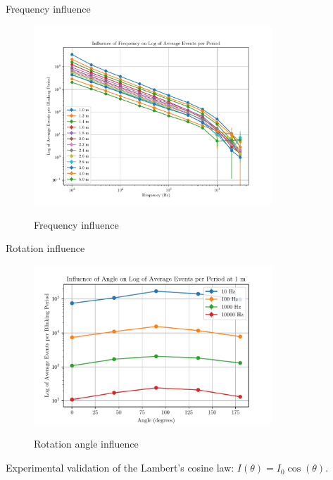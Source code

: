 \documentclass{beamer}
\begin{document}
\begin{frame}{Frequency influence}

\begin{figure}[H]
    \centering
    \includegraphics[width=0.8\textwidth]{../fig/semestral/freqlog.pdf}
    \label{fig:freq_influence}
    \caption{Frequency influence}
\end{figure}

\end{frame}

\begin{frame}{Rotation influence}

\begin{figure}[H]
    \centering
    \includegraphics[width=0.8\textwidth]{../fig/semestral/angle2.pdf}
    \label{fig:rotation_influence}
    \caption{Rotation angle influence}
\end{figure}

\small{
    Experimental validation of the Lambert's cosine law: $I(\theta) = I_0\cos(\theta)$.
}

\end{frame}
\end{document}
